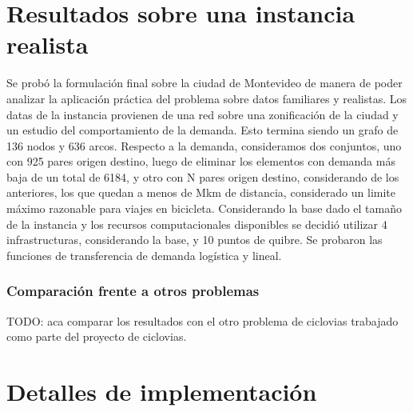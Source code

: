 \documentclass{article}
\begin{document}

  \section*{Resultados sobre una instancia realista}

  Se probó la formulación final sobre la ciudad de Montevideo de manera de poder analizar la aplicación práctica del problema sobre datos familiares y realistas. Los datas de la instancia provienen de una red sobre una zonificación de la ciudad y un estudio del comportamiento de la demanda. Esto termina siendo un grafo de 136 nodos y 636 arcos. Respecto a la demanda, consideramos dos conjuntos, uno con 925 pares origen destino, luego de eliminar los elementos con demanda más baja de un total de 6184, y otro con N pares origen destino, considerando de los anteriores, los que quedan a menos de Mkm de distancia, considerado un limite máximo razonable para viajes en bicicleta. Considerando la base dado el tamaño de la instancia y los recursos computacionales disponibles se decidió utilizar 4 infrastructuras, considerando la base, y 10 puntos de quibre. Se probaron las funciones de transferencia de demanda logística y lineal.



  \subsubsection*{Comparación frente a otros problemas}

  TODO: aca comparar los resultados con el otro problema de ciclovias trabajado como parte del proyecto de ciclovias.

  \section*{Detalles de implementación}
\end{document}
